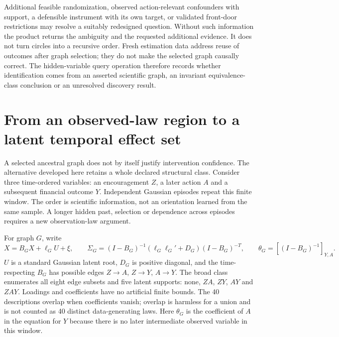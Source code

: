 Additional feasible randomization, observed action-relevant confounders
with support, a defensible instrument with its own target, or validated
front-door restrictions may resolve a suitably redesigned question. Without
such information the product returns the ambiguity and the requested
additional evidence. It does not turn circles into a recursive order.
Fresh estimation data address reuse of outcomes after graph selection;
they do not make the selected graph causally correct. The hidden-variable
query operation therefore records whether identification comes from an
asserted scientific graph, an invariant equivalence-class conclusion or
an unresolved discovery result.


\section{From an observed-law region to a latent temporal effect set}
\label{c7:latent-confidence}
A selected ancestral graph does not by itself justify intervention confidence.
The alternative developed here retains a whole declared structural class.
Consider three time-ordered variables: an encouragement $Z$, a later action
$A$ and a subsequent financial outcome $Y$. Independent Gaussian episodes
repeat this finite window. The order is scientific information, not an
orientation learned from the same sample. A longer hidden past, selection or
dependence across episodes requires a new observation-law argument.

For graph $G$, write
\begin{equation}
 X=B_GX+\ell_G U+\xi,\qquad
 \Sigma_G=(I-B_G)^{-1}(\ell_G\ell_G'+D_G)(I-B_G)^{-T},\qquad
 \theta_G=[(I-B_G)^{-1}]_{Y,A}.
 \label{c7:structural-map}
\end{equation}
$U$ is a standard Gaussian latent root, $D_G$ is positive diagonal, and
the time-respecting $B_G$ has possible edges $Z\to A$, $Z\to Y$, $A\to Y$.
The broad class enumerates all eight edge subsets and five latent supports:
none, $ZA$, $ZY$, $AY$ and $ZAY$. Loadings and coefficients have no artificial
finite bounds. The 40 descriptions overlap when coefficients vanish; overlap
is harmless for a union and is not counted as 40 distinct data-generating laws.
Here $\theta_G$ is the coefficient of $A$ in the equation for $Y$ because
there is no later intermediate observed variable in this window.

